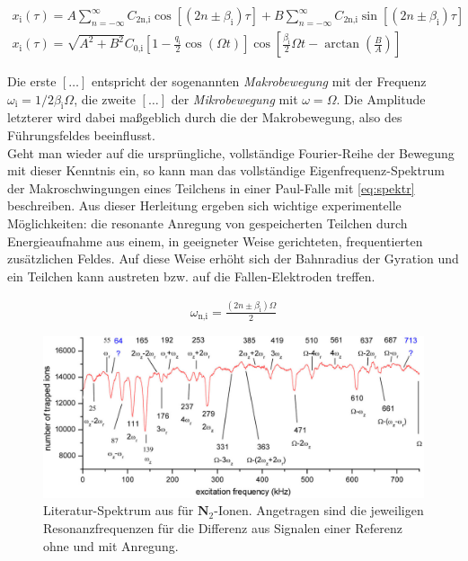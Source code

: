 \documentclass[numbers=noenddot,a4paper,notitlepage,twoside,BCOR15mm]{scrartcl}
\newcommand{\ix}[1]{_\text{#1}}
\newcommand{\tilt}[1]{\textit{#1}}
\newcommand{\fett}[1]{\textbf{#1}}
\begin{document}
					\begin{align}
						x\ix{i}(\tau)=A\sum_{n=-\infty}^{\infty}C\ix{2n,i}\cos[(2n\pm\beta\ix{i})\tau]+B\sum_{n=-\infty}^{\infty}C\ix{2n,i}\sin[(2n\pm\beta\ix{i})\tau] \label{eq:fourie} \\
						x\ix{i}(\tau)=\sqrt{A^2+B^2}C\ix{0,i}\left[1-\frac{q\ix{i}}{2}\cos(\Omega t)\right]\cos\left[\frac{\beta\ix{i}}{2}\Omega t-\arctan\left(\frac{B}{A}\right)\right] \label{eq:beweg}
					\end{align}

			Die erste $\left[\dots\right]$ entspricht der sogenannten \tilt{Makrobewegung} mit der Frequenz $\omega\ix{i}=1/2 \beta\ix{i}\Omega$, die zweite $\left[\dots\right]$ der \tilt{Mikrobewegung} mit $\omega=\Omega$. Die Amplitude letzterer wird dabei maßgeblich durch die der Makrobewegung, also des Führungsfeldes beeinflusst.\\
			Geht man wieder auf die ursprüngliche, vollständige Fourier-Reihe der Bewegung mit dieser Kenntnis ein, so kann man das vollständige Eigenfrequenz-Spektrum der Makroschwingungen eines Teilchens in einer Paul-Falle mit \autoref{eq:spektr} beschreiben. Aus dieser Herleitung ergeben sich wichtige experimentelle Möglichkeiten: die resonante Anregung von gespeicherten Teilchen durch Energieaufnahme aus einem, in geeigneter Weise gerichteten, frequentierten zusätzlichen Feldes. Auf diese Weise erhöht sich der Bahnradius der Gyration und ein Teilchen kann austreten bzw. auf die Fallen-Elektroden treffen.

				\begin{align}
					\omega\ix{n,i}=\frac{(2n\pm\beta\ix{i})\Omega}{2} \label{eq:spektr}
				\end{align}

			\begin{figure}
				\centering
				\includegraphics[width=\textwidth]{referenz.png}
				\caption{Literatur-Spektrum aus \cite{Paul-FalleREF} für $\fett{N}_2$-Ionen. Angetragen sind die jeweiligen Resonanzfrequenzen für die Differenz aus Signalen einer Referenz ohne und mit Anregung.}\label{img:referenz}
			\end{figure}
\end{document}
